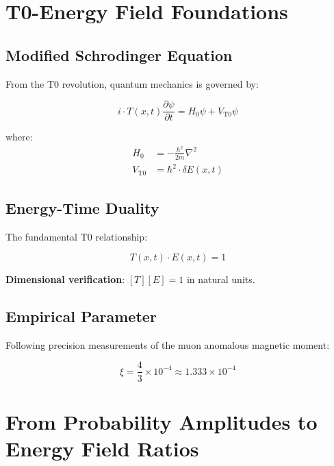\documentclass[12pt,a4paper]{article}
\newcommand{\xipar}{\xi}
\begin{document}
	\section{T0-Energy Field Foundations}
	
	\subsection{Modified Schrodinger Equation}
	
	From the T0 revolution, quantum mechanics is governed by:
	
	\begin{equation}
		\boxed{i \cdot T(x,t) \frac{\partial\psi}{\partial t} = H_0 \psi + V_{\mathrm{T0}} \psi}
		\label{eq:modified_schrodinger}
	\end{equation}
	
	where:
	\begin{align}
		H_0 &= -\frac{\hbar^2}{2m} \nabla^2 \\
		V_{\mathrm{T0}} &= \hbar^2 \cdot \delta E(x,t)
	\end{align}
	
	\subsection{Energy-Time Duality}
	
	The fundamental T0 relationship:
	
	\begin{equation}
		\boxed{T(x,t) \cdot E(x,t) = 1}
		\label{eq:energy_time_duality}
	\end{equation}
	
	\textbf{Dimensional verification}: $[T][E] = 1$ in natural units.
	
	\subsection{Empirical Parameter}
	
	Following precision measurements of the muon anomalous magnetic moment:
	
	\begin{equation}
		\boxed{\xipar = \frac{4}{3} \times 10^{-4} \approx 1.333 \times 10^{-4}}
		\label{eq:empirical_parameter}
	\end{equation}
	
	\section{From Probability Amplitudes to Energy Field Ratios}
	
\end{document}
